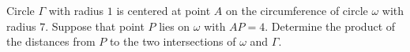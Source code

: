 Circle $\Gamma$ with radius $1$ is centered at point $A$ on the circumference of circle $\omega$ with radius $7$. Suppose that point $P$ lies on $\omega$ with $AP=4$. Determine the product of the distances from $P$ to the two intersections of $\omega$ and $\Gamma$.